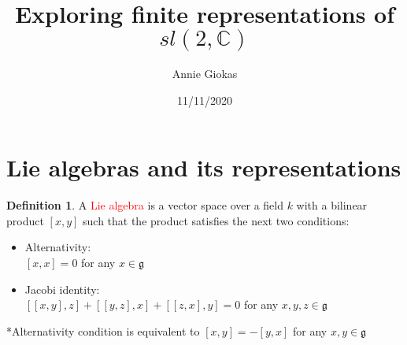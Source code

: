 \documentclass{article}
\begin{document}
\newcommand{\N}{\mathbb{N}}
\newcommand{\Z}{\mathbb{Z}}
\newcommand{\R}{\mathbb{R}}
\newcommand{\Q}{\mathbb{Q}}
\newcommand{\C}{\mathbb{C}}
\newcommand{\K}{\mathbb{K}}
\newcommand{\F}{\mathbb{F}}

\newcommand{\g}{\mathfrak{g}}

\newcommand{\B}{\mathcal{B}}
\newcommand{\T}{\mathcal{T}}
\newcommand{\U}{\mathcal{U}}
\newcommand{\D}{\mathcal{D}}
\newcommand{\J}{\mathcal{J}}


\title{Exploring finite representations of $sl(2,\C)$}
\author{Annie Giokas}
\date{11/11/2020}
\maketitle
\pagestyle{empty} 
\setlength{\topmargin}{-.4in} 
\setlength{\textheight}{9.5in} 
\setlength{\textwidth}{7in} 
\setlength{\oddsidemargin}{-.2in} 
\setlength{\evensidemargin}{-.2in}

\newenvironment{topic}[1]{\begin{trivlist}\item[]{\bf #1:}}{\end{trivlist}}

\renewcommand{\qed}{\hfill\blacksquare}
\newcommand{\qedwhite}{\hfill \ensuremath{\Box}}

\newcommand*\interior[1]{\mathring{#1}}
\newcommand*\closure[1]{\overline{#1}} %
\newcommand*\boundary[1]{\partial {#1}}

\newtheorem{theorem}{Theorem}[section]
\newtheorem{corollary}{Corollary}[theorem]
\newtheorem{lemma}[theorem]{Lemma}
\theoremstyle{definition}
\newtheorem{definition}{Definition}[section]

\section{Lie algebras and its representations}
\begin{definition}A \textcolor{red}{Lie algebra} is a vector space over a field $k$ with a bilinear product $[x,y]$ such that the product satisfies the next two conditions:
\begin{itemize}
\item Alternativity:\\
$[x,x]=0$ for any $x\in \g$

\item Jacobi identity:\\
$[[x,y],z]+[[y,z],x]+[[z,x],y]=0$ for any $x,y,z\in \g$
\end{itemize}
\end{definition}
*Alternativity condition is equivalent to $[x,y]=-[y,x]$ for any $x,y\in \g$
\end{document}
